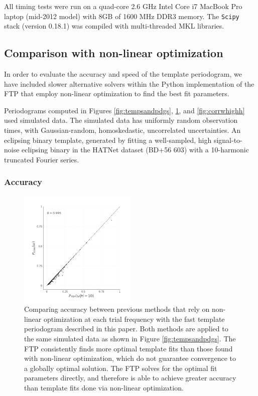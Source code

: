 \documentclass[apj]{emulateapj}
\begin{document}
All timing tests were run on a quad-core 2.6 GHz Intel Core i7 MacBook
Pro laptop (mid-2012 model) with 8GB of 1600 MHz DDR3 memory. The \texttt{Scipy} stack
(version 0.18.1) was compiled with multi-threaded MKL libraries.

\subsection{Comparison with non-linear optimization}

In order to evaluate the accuracy and speed of the template periodogram,
we have included slower alternative solvers within the Python implementation
of the FTP that employ non-linear optimization to find the best fit parameters.

Periodograms computed in Figures \ref{fig:tempsandpdgs}, \ref{fig:corrwgats},
and \ref{fig:corrwhighh} used simulated data. The simulated data has uniformly
random observation times, with Gaussian-random, homoskedastic, uncorrelated
uncertainties. An eclipsing binary template, generated by fitting a well-sampled,
high signal-to-noise eclipsing binary in the HATNet dataset (BD+56 603)
with a 10-harmonic truncated Fourier series.

\subsubsection{Accuracy}

\begin{figure}
    \centering
    \includegraphics[width=0.5\textwidth]{plots/correlation_with_nonlinopt.pdf}
    \caption{\label{fig:corrwgats} Comparing accuracy between previous methods that rely
            on non-linear optimization at each trial frequency with the fast template periodogram
            described in this paper. Both methods are applied to the same simulated data as shown
            in Figure \ref{fig:tempsandpdgs}.
            The FTP consistently finds more optimal template fits than
            those found with non-linear optimization, which do not guarantee convergence to
            a globally optimal solution. The FTP solves for the optimal
            fit parameters directly, and therefore is able to achieve greater accuracy than template
            fits done via non-linear optimization.}
\end{figure}
\end{document}
